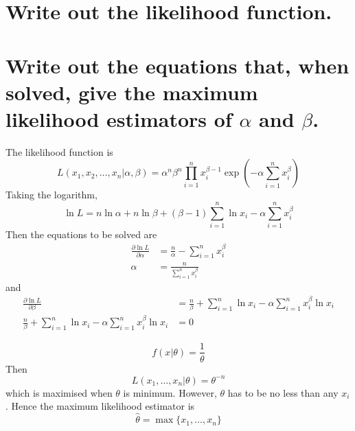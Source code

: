 \documentclass[answers]{exam}
\begin{document}
\begin{questions}
\begin{parts}
    \part{Write out the likelihood function.}
    \part{Write out the equations that, when solved, give the maximum likelihood estimators of $\alpha$ and $\beta$.}
\end{parts}

\begin{solution}
    The likelihood function is
    $$L(x_1,x_2,\dots,x_n|\alpha,\beta) = \alpha^n\beta^n \prod_{i=1}^n x_i^{\beta-1} \exp\left(-\alpha \sum_{i=1}^n x_i^\beta\right)$$
    Taking the logarithm,
    $$\ln L = n\ln\alpha + n\ln\beta + (\beta-1)\sum_{i=1}^n \ln x_i - \alpha \sum_{i=1}^n x_i^\beta$$
    Then the equations to be solved are
    \begin{align*}
        \frac{\partial \ln L}{\partial \alpha} &= \frac{n}{\alpha} - \sum_{i=1}^n x_i^\beta \\
        \alpha &= \frac{n}{\sum_{i=1}^n x_i^\beta}
    \end{align*}
    and
    \begin{align*}
        \frac{\partial \ln L}{\partial \beta} &= \frac{n}{\beta} + \sum_{i=1}^n \ln x_i - \alpha \sum_{i=1}^n x_i^\beta \ln x_i \\
        \frac{n}{\beta} + \sum_{i=1}^n \ln x_i - \alpha \sum_{i=1}^n x_i^\beta \ln x_i &= 0
    \end{align*}
\end{solution}


\begin{solution}
    $$f(x|\theta) = \frac{1}{\theta}$$
    Then
    $$L(x_1,\dots,x_n|\theta) = \theta^{-n}$$
    which is maximised when $\theta$ is minimum. However, $\theta$ has to be no less than any $x_i$. Hence the maximum likelihood estimator is
    $$\hat\theta = \max\{x_1,\dots,x_n\}$$
\end{solution}



\end{questions}
\end{document}
